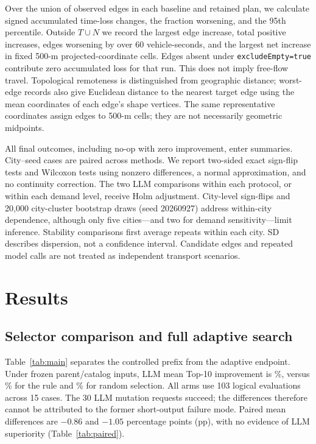 \documentclass[11pt]{article}
\begin{document}
Over the union of observed edges in each baseline and retained plan, we calculate signed accumulated time-loss changes, the fraction worsening, and the 95th percentile. Outside $T\cup N$ we record the largest edge increase, total positive increases, edges worsening by over 60 vehicle-seconds, and the largest net increase in fixed 500-m projected-coordinate cells. Edges absent under \texttt{excludeEmpty=true} contribute zero accumulated loss for that run. This does not imply free-flow travel. Topological remoteness is distinguished from geographic distance; worst-edge records also give Euclidean distance to the nearest target edge using the mean coordinates of each edge's shape vertices. The same representative coordinates assign edges to 500-m cells; they are not necessarily geometric midpoints.

All final outcomes, including no-op with zero improvement, enter summaries. City--seed cases are paired across methods. We report two-sided exact sign-flip tests and Wilcoxon tests using nonzero differences, a normal approximation, and no continuity correction. The two LLM comparisons within each protocol, or within each demand level, receive Holm adjustment. City-level sign-flips and 20,000 city-cluster bootstrap draws (seed 20260927) address within-city dependence, although only five cities---and two for demand sensitivity---limit inference. Stability comparisons first average repeats within each city. SD describes dispersion, not a confidence interval. Candidate edges and repeated model calls are not treated as independent transport scenarios.

\section{Results}\label{sec:results}
\subsection{Selector comparison and full adaptive search}\label{sec:main-results}
Table~\ref{tab:main} separates the controlled prefix from the adaptive endpoint. Under frozen parent/catalog inputs, LLM mean Top-10 improvement is \StrictLLMTop\%, versus \StrictRuleTop\% for the rule and \StrictRandomTop\% for random selection. All arms use 103 logical evaluations across 15 cases. The 30 LLM mutation requests succeed; the differences therefore cannot be attributed to the former short-output failure mode. Paired mean differences are $-0.86$ and $-1.05$ percentage points (pp), with no evidence of LLM superiority (Table~\ref{tab:paired}).
\end{document}
